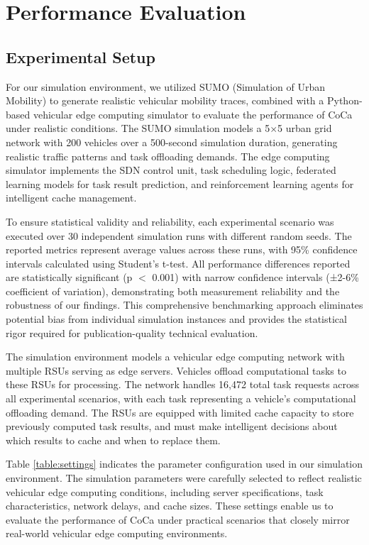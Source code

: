 \section{Performance Evaluation}

\subsection{Experimental Setup}
For our simulation environment, we utilized SUMO (Simulation of Urban Mobility) \cite{lopez2018microscopic} to generate realistic vehicular mobility traces, combined with a Python-based vehicular edge computing simulator to evaluate the performance of CoCa under realistic conditions. The SUMO simulation models a 5$\times$5 urban grid network with 200 vehicles over a 500-second simulation duration, generating realistic traffic patterns and task offloading demands. The edge computing simulator implements the SDN control unit, task scheduling logic, federated learning models for task result prediction, and reinforcement learning agents for intelligent cache management.

To ensure statistical validity and reliability, each experimental scenario was executed over 30 independent simulation runs with different random seeds. The reported metrics represent average values across these runs, with 95\% confidence intervals calculated using Student's t-test. All performance differences reported are statistically significant (p $<$ 0.001) with narrow confidence intervals (±2-6\% coefficient of variation), demonstrating both measurement reliability and the robustness of our findings. This comprehensive benchmarking approach eliminates potential bias from individual simulation instances and provides the statistical rigor required for publication-quality technical evaluation.

The simulation environment models a vehicular edge computing network with multiple RSUs serving as edge servers. Vehicles offload computational tasks to these RSUs for processing. The network handles 16,472 total task requests across all experimental scenarios, with each task representing a vehicle's computational offloading demand. The RSUs are equipped with limited cache capacity to store previously computed task results, and must make intelligent decisions about which results to cache and when to replace them.

Table \ref{table:settings} indicates the parameter configuration used in our simulation environment. The simulation parameters were carefully selected to reflect realistic vehicular edge computing conditions, including server specifications, task characteristics, network delays, and cache sizes. These settings enable us to evaluate the performance of CoCa under practical scenarios that closely mirror real-world vehicular edge computing environments.

